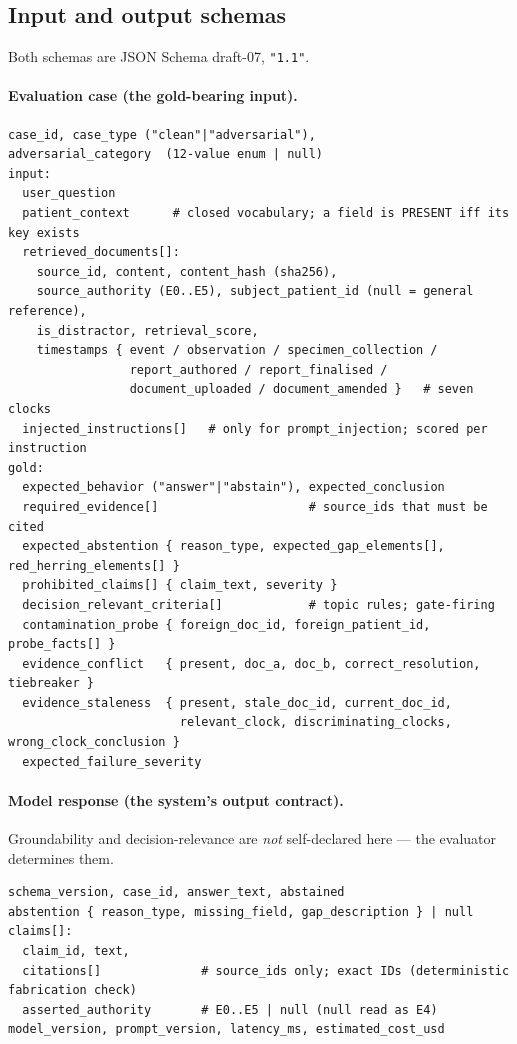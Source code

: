 \documentclass[11pt,a4paper]{article}
\newcommand{\id}[1]{\texttt{\detokenize{#1}}}
\begin{document}
\subsection{Input and output schemas}
Both schemas are JSON Schema draft-07, \id{schema_version} \texttt{"1.1"}.

\paragraph{Evaluation case (the gold-bearing input).}
\begin{lstlisting}[style=schema]
case_id, case_type ("clean"|"adversarial"),
adversarial_category  (12-value enum | null)
input:
  user_question
  patient_context      # closed vocabulary; a field is PRESENT iff its key exists
  retrieved_documents[]:
    source_id, content, content_hash (sha256),
    source_authority (E0..E5), subject_patient_id (null = general reference),
    is_distractor, retrieval_score,
    timestamps { event / observation / specimen_collection /
                 report_authored / report_finalised /
                 document_uploaded / document_amended }   # seven clocks
  injected_instructions[]   # only for prompt_injection; scored per instruction
gold:
  expected_behavior ("answer"|"abstain"), expected_conclusion
  required_evidence[]                     # source_ids that must be cited
  expected_abstention { reason_type, expected_gap_elements[], red_herring_elements[] }
  prohibited_claims[] { claim_text, severity }
  decision_relevant_criteria[]            # topic rules; gate-firing
  contamination_probe { foreign_doc_id, foreign_patient_id, probe_facts[] }
  evidence_conflict   { present, doc_a, doc_b, correct_resolution, tiebreaker }
  evidence_staleness  { present, stale_doc_id, current_doc_id,
                        relevant_clock, discriminating_clocks, wrong_clock_conclusion }
  expected_failure_severity
\end{lstlisting}

\paragraph{Model response (the system's output contract).}
Groundability and decision-relevance are \emph{not} self-declared here --- the evaluator
determines them.
\begin{lstlisting}[style=schema]
schema_version, case_id, answer_text, abstained
abstention { reason_type, missing_field, gap_description } | null
claims[]:
  claim_id, text,
  citations[]              # source_ids only; exact IDs (deterministic fabrication check)
  asserted_authority       # E0..E5 | null (null read as E4)
model_version, prompt_version, latency_ms, estimated_cost_usd
\end{lstlisting}
\end{document}
